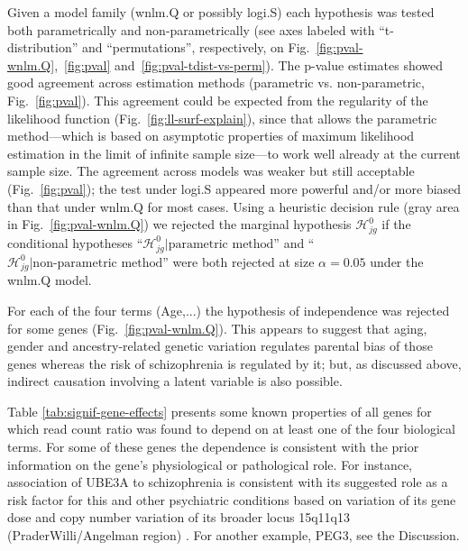 \documentclass[letterpaper]{article}
\begin{document}
Given a model family (wnlm.Q or possibly logi.S) each hypothesis was tested
both parametrically and non-parametrically (see axes labeled with
``t-distribution'' and ``permutations'', respectively, on
Fig.~\ref{fig:pval-wnlm.Q},~\ref{fig:pval} and~\ref{fig:pval-tdist-vs-perm}).
The p-value estimates showed good agreement across estimation methods
(parametric vs. non-parametric, Fig.~\ref{fig:pval}). This agreement could be
expected from the regularity of the likelihood function
(Fig.~\ref{fig:ll-surf-explain}), since that allows the parametric
method---which is based on asymptotic properties of maximum likelihood
estimation in the limit of infinite sample size---to work well already at the
current sample size. The agreement across models was weaker but still
acceptable (Fig.~\ref{fig:pval}); the test under logi.S appeared more powerful
and/or more biased than that under wnlm.Q for most cases. Using a heuristic
decision rule (gray area in Fig.~\ref{fig:pval-wnlm.Q}) we rejected the
marginal hypothesis \(\mathcal{H}^0_{jg}\) if the conditional hypotheses
``\(\mathcal{H}^0_{jg} |\text{parametric method}\)'' and
``\(\mathcal{H}^0_{jg} |\text{non-parametric method}\)'' were both rejected at
size \(\alpha = 0.05\) under the wnlm.Q model.

For each of the four terms (Age,...) the hypothesis of independence was rejected for some genes
(Fig.~\ref{fig:pval-wnlm.Q}). This appears to suggest that aging, gender and ancestry-related genetic variation regulates
parental bias of those genes whereas the risk of schizophrenia is regulated by it; but, as discussed
above, indirect causation involving a latent variable is also possible.

\begin{table}
\footnotesize

\caption{}
\label{tab:signif-gene-effects}
\end{table}

Table \ref{tab:signif-gene-effects} presents some known properties of all genes for which read count ratio was found
to depend on at least one of the four biological terms. For some of these genes the dependence
is consistent with the prior information on the gene's physiological or pathological role.
For instance, association of
UBE3A to schizophrenia is consistent with its suggested role as a risk factor for this and other
psychiatric conditions based on variation of its gene dose and copy number variation of its broader
locus 15q11q13 (PraderWilli/Angelman region) \cite{Sullivan2012,
McNamara2013}.  For another example, PEG3, see the Discussion.
\end{document}

